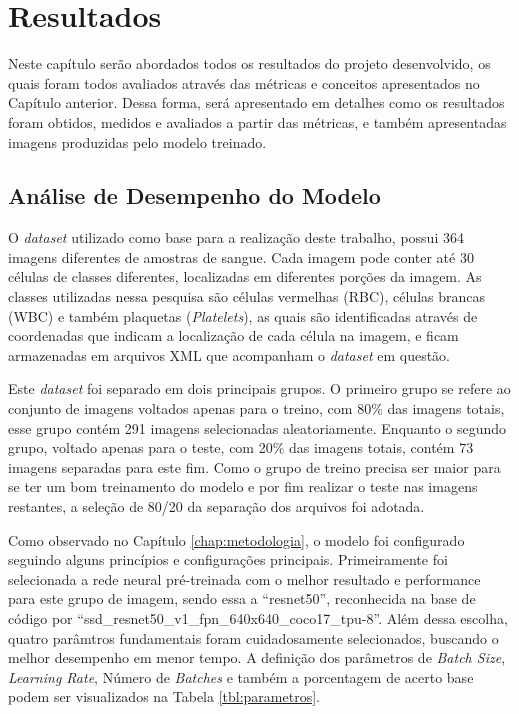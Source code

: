 \chapter{Resultados}
\label{chap:resultados}
Neste capítulo serão abordados todos os resultados do projeto desenvolvido, os quais foram todos avaliados através das métricas e conceitos apresentados no Capítulo anterior. Dessa forma, será apresentado em detalhes como os resultados foram obtidos, medidos e avaliados a partir das métricas, e também apresentadas imagens produzidas pelo modelo treinado. 

\section{Análise de Desempenho do Modelo}

O \emph{dataset} utilizado como base para a realização deste trabalho, possui 364 imagens diferentes de amostras de sangue. Cada imagem pode conter até 30 células de classes diferentes, localizadas em diferentes porções da imagem. As classes utilizadas nessa pesquisa são células vermelhas (RBC), células brancas (WBC) e também plaquetas (\emph{Platelets}), as quais são identificadas através de coordenadas que indicam a localização de cada célula na imagem, e ficam armazenadas em arquivos XML que acompanham o \emph{dataset} em questão.

Este \emph{dataset} foi separado em dois principais grupos. O primeiro grupo se refere ao conjunto de imagens voltados apenas para o treino, com 80\% das imagens totais, esse grupo contém 291 imagens selecionadas aleatoriamente. Enquanto o segundo grupo, voltado apenas para o teste, com 20\% das imagens totais, contém 73 imagens separadas para este fim. Como o grupo de treino precisa ser maior para se ter um bom treinamento do modelo e por fim realizar o teste nas imagens restantes, a seleção de 80/20 da separação dos arquivos foi adotada.

Como observado no Capítulo \ref{chap:metodologia}, o modelo foi configurado seguindo alguns princípios e configurações principais. Primeiramente foi selecionada a rede neural pré-treinada com o melhor resultado e performance para este grupo de imagem, sendo essa a ``resnet50'', reconhecida na base de código por ``ssd\_resnet50\_v1\_fpn\_640x640\_coco17\_tpu-8''. Além dessa escolha, quatro parâmtros fundamentais foram cuidadosamente selecionados, buscando o melhor desempenho em menor tempo. A definição dos parâmetros de \emph{Batch Size}, \emph{Learning Rate}, Número de \emph{Batches} e também a porcentagem de acerto base podem ser visualizados na Tabela \ref{tbl:parametros}.


